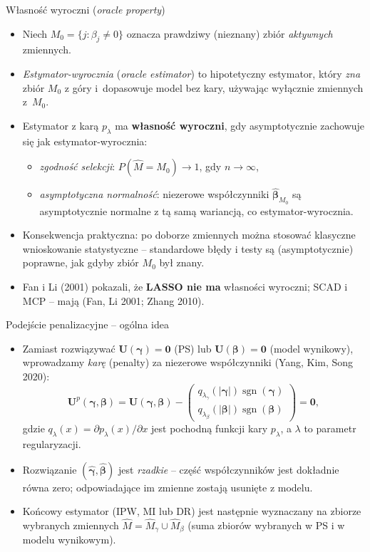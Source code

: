 \documentclass[10pt,ignorenonframetext, aspectratio=169]{beamer}
\newcommand{\bU}{\boldsymbol{U}}
\newcommand{\bbeta}{\boldsymbol{\beta}}
\newcommand{\bgamma}{\boldsymbol{\gamma}}
\newcommand{\bZero}{\boldsymbol{0}}
\begin{document}
\begin{frame}{Własność wyroczni (\emph{oracle property})}
\begin{itemize}
\justifying
    \item Niech $M_0 = \{j : \beta_j \neq 0\}$ oznacza prawdziwy (nieznany) zbiór \emph{aktywnych} zmiennych.
    \item \emph{Estymator-wyrocznia} (\emph{oracle estimator}) to hipotetyczny estymator, który \emph{zna} zbiór $M_0$ z góry i~dopasowuje model bez kary, używając wyłącznie zmiennych z~$M_0$.
    \item Estymator z karą $p_\lambda$ ma \textbf{własność wyroczni}, gdy asymptotycznie zachowuje się jak estymator-wyrocznia:
    \begin{itemize}
        \item[(P1)] \emph{zgodność selekcji}: $P(\hat{M} = M_0) \rightarrow 1$, gdy $n \rightarrow \infty$,
        \item[(P2)] \emph{asymptotyczna normalność}: niezerowe współczynniki $\hat{\bbeta}_{M_0}$ są asymptotycznie normalne z tą samą wariancją, co estymator-wyrocznia.
    \end{itemize}
    \item Konsekwencja praktyczna: po doborze zmiennych można stosować klasyczne wnioskowanie statystyczne -- standardowe błędy i testy są (asymptotycznie) poprawne, jak gdyby zbiór $M_0$ był znany.
    \item Fan i Li (2001) pokazali, że \textbf{LASSO nie ma} własności wyroczni; SCAD i MCP -- mają (Fan, Li 2001; Zhang 2010).
\end{itemize}
\end{frame}

\begin{frame}{Podejście penalizacyjne -- ogólna idea}
\begin{itemize}
\justifying
    \item Zamiast rozwiązywać $\bU(\bgamma)=\bZero$ (PS) lub $\bU(\bbeta)=\bZero$ (model wynikowy), wprowadzamy \emph{karę} (penalty) za niezerowe współczynniki (Yang, Kim, Song 2020):
    \begin{equation}
        \bU^p\!\left(\bgamma, \bbeta\right) = \bU\!\left(\bgamma, \bbeta\right) - \begin{pmatrix} q_{\lambda_\gamma}\!\left(|\bgamma|\right) \operatorname{sgn}(\bgamma) \\ q_{\lambda_\beta}\!\left(|\bbeta|\right) \operatorname{sgn}(\bbeta) \end{pmatrix} = \bZero,
    \end{equation}
    gdzie $q_{\lambda}(x) = \partial p_{\lambda}(x)/\partial x$ jest pochodną funkcji kary $p_{\lambda}$, a $\lambda$ to parametr regularyzacji.
    \item Rozwiązanie $(\hat{\bgamma}, \hat{\bbeta})$ jest \emph{rzadkie} -- część współczynników jest dokładnie równa zero; odpowiadające im zmienne zostają usunięte z modelu.
    \item Końcowy estymator (IPW, MI lub DR) jest następnie wyznaczany na zbiorze wybranych zmiennych $\hat{M} = \hat{M}_\gamma \cup \hat{M}_\beta$ (suma zbiorów wybranych w PS i w modelu wynikowym).
\end{itemize}
\end{frame}
\end{document}
